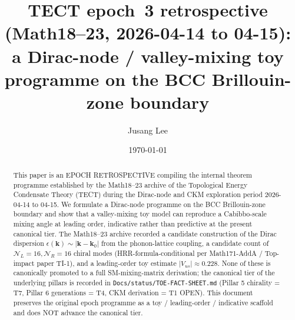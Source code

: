 



\title{TECT epoch~3 retrospective (Math18--23, 2026-04-14 to 04-15):
a Dirac-node / valley-mixing toy programme on the BCC Brillouin-zone
boundary}

\author{Jusang Lee}

\date{\today}

\begin{abstract}
This paper is an EPOCH RETROSPECTIVE compiling the internal theorem
programme established by the Math18--23 archive of the Topological
Energy Condensate Theory (TECT) during the Dirac-node and CKM
exploration period 2026-04-14 to 04-15. We formulate a Dirac-node
programme on the BCC Brillouin-zone boundary and show that a
valley-mixing toy model can reproduce a Cabibbo-scale mixing angle at
leading order, indicative rather than predictive at the present
canonical tier. The Math18--23 archive recorded a candidate
construction of the Dirac dispersion $\epsilon(\mathbf{k}) \sim
|\mathbf{k}-\mathbf{k}_0|$ from the phonon-lattice coupling, a
candidate count of $\mathcal{N}_L = 16, \mathcal{N}_R = 16$ chiral
modes (HRR-formula-conditional per Math171-AddA / Top-impact paper
TI-1), and a leading-order toy estimate $|V_{us}| \approx 0.228$.
None of these is canonically promoted to a full SM-mixing-matrix
derivation; the canonical tier of the underlying pillars is recorded
in \texttt{Docs/status/TOE-FACT-SHEET.md} (Pillar 5 chirality = T7,
Pillar 6 generations = T4, CKM derivation = T1 OPEN). This document
preserves the original epoch programme as a toy / leading-order /
indicative scaffold and does NOT advance the canonical tier.
\cite{Math18, Math19, Math20, Math21, Math22, Math23}
\end{abstract}

